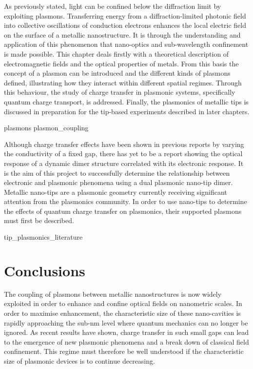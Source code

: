 \documentclass[12pt, a4paper, oneside]{book}
\begin{document}
As previously stated, light can be confined below the diffraction limit by exploiting plasmons. Transferring energy from a diffraction-limited photonic field into collective oscillations of conduction electrons enhances the local electric field on the surface of a metallic nanostructure. It is through the understanding and application of this phenomenon that nano-optics and sub-wavelength confinement is made possible.
This chapter deals firstly with a theoretical description of electromagnetic fields and the optical properties of metals. From this basis the concept of a plasmon can be introduced and the different kinds of plasmons defined, illustrating how they interact within different spatial regimes. Through this behaviour, the study of charge transfer in plasmonic systems, specifically quantum charge transport, is addressed. Finally, the plasmonics of metallic tips is discussed in preparation for the tip-based experiments described in later chapters.

{plasmons}
{plasmon_coupling}

Although charge transfer effects have been shown in previous reports by varying the conductivity of a fixed gap, there has yet to be a report showing the optical response of a dynamic dimer structure correlated with its electronic response. It is the aim of this project to successfully determine the relationship between electronic and plasmonic phenomena using a dual plasmonic nano-tip dimer. Metallic nano-tips are a plasmonic geometry currently receiving significant attention from the plasmonics community. In order to use nano-tips to determine the effects of quantum charge transfer on plasmonics, their supported plasmons must first be described.

{tip_plasmonics_literature}

\section{Conclusions}

The coupling of plasmons between metallic nanostructures is now widely exploited in order to enhance and confine optical fields on nanometric scales. In order to maximise enhancement, the characteristic size of these nano-cavities is rapidly approaching the sub-nm level where quantum mechanics can no longer be ignored. As recent results have shown, charge transfer in such small gaps can lead to the emergence of new plasmonic phenomena and a break down of classical field confinement. This regime must therefore be well understood if the characteristic size of plasmonic devices is to continue decreasing.
\end{document}
